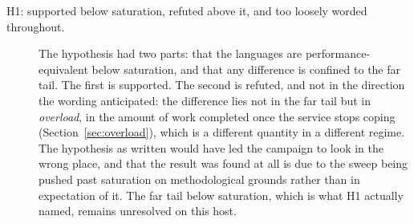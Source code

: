 \documentclass[english,twoside,openright,a4paper,censored,csm,software-track-2020]{HYthesisML}
\begin{document}
\begin{description}
  \item[H1: supported below saturation, refuted above it, and too loosely worded throughout.]
        The hypothesis had two parts: that the languages are performance-equivalent below
        saturation, and that any difference is confined to the far tail. The first is
        supported. The second is refuted, and not in the direction the wording anticipated:
        the difference lies not in the far tail but in \emph{overload}, in the amount of work
        completed once the service stops coping (Section~\ref{sec:overload}), which is a
        different quantity in a different regime. The hypothesis as written would have led
        the campaign to look in the wrong place, and that the result was found at all is due
        to the sweep being pushed past saturation on methodological grounds rather than in
        expectation of it. The far tail below saturation, which is what H1 actually named,
        remains unresolved on this host.


\end{description}
\end{document}
